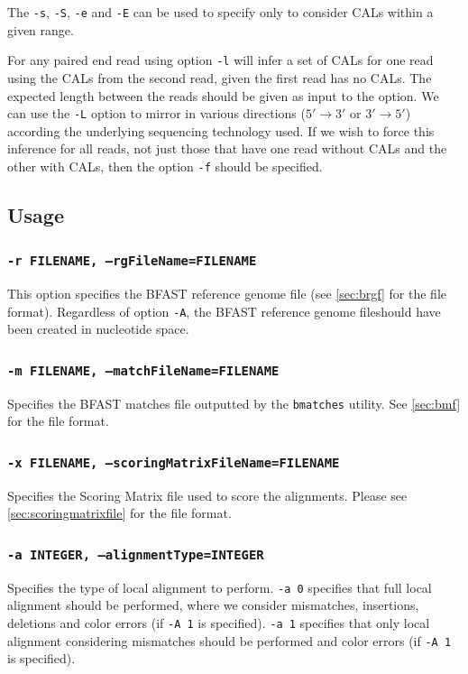 \documentclass[a4paper,12pt]{book}
\newcommand{\TT}[1]{{\tt #1}} %
\newcommand{\BRGF}{BFAST reference genome file} %
\newcommand{\BMF}{BFAST matches file} %
\begin{document}
The \TT{-s}, \TT{-S}, \TT{-e} and \TT{-E} can be used to specify only to consider CALs within a given range.

For any paired end read using option \TT{-l} will infer a set of CALs for one read using the CALs from the second read, given the first read has no CALs.
The expected length between the reads should be given as input to the option.
We can use the \TT{-L} option to mirror in various directions ($5'\rightarrow 3'$ or $3'\rightarrow 5'$) according the underlying sequencing technology used. 
If we wish to force this inference for all reads, not just those that have one read without CALs and the other with CALs, then the option \TT{-f} should be specified.

\subsection{Usage}
\subsubsection{\TT{-r FILENAME, --rgFileName=FILENAME}}
This option specifies the \BRGF{} (see \autoref{sec:brgf} for the file format).
Regardless of option \TT{-A}, the \BRGF should have been created in nucleotide space.

\subsubsection{\TT{-m FILENAME, --matchFileName=FILENAME}}
Specifies the \BMF{} outputted by the \TT{bmatches} utility.
See \autoref{sec:bmf} for the file format.

\subsubsection{\TT{-x FILENAME, --scoringMatrixFileName=FILENAME}}
Specifies the Scoring Matrix file used to score the alignments.
Please see \autoref{sec:scoringmatrixfile} for the file format.

\subsubsection{\TT{-a INTEGER, --alignmentType=INTEGER}}
Specifies the type of local alignment to perform.
\TT{-a 0} specifies that full local alignment should be performed, where we consider mismatches, insertions, deletions and color errors (if \TT{-A 1} is specified).
\TT{-a 1} specifies that only local alignment considering mismatches should be performed and color errors (if \TT{-A 1} is specified).
%
\end{document}
